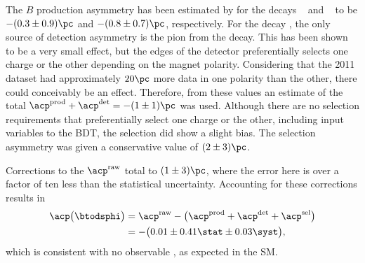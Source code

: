 The $B$ production asymmetry has been estimated by \lhcb for the decays
\decay{\Bp}{\jpsi\pip}~\cite{LHCb-PAPER-2011-024} and
\decay{\Bp}{\Dz\Kp}~\cite{LHCb-PAPER-2012-001} to be
$-(0.3\pm0.9)\pc$ and $-(0.8\pm0.7)\pc$, respectively.
For the decay \btodsphi, the only source of detection asymmetry is the pion from the \Ds decay.
This has been shown to be a very small effect, but the edges of the detector preferentially selects
one charge or the other depending on the magnet polarity.
Considering that the 2011 dataset had approximately $20\pc$ more data in one polarity than the
other, there could conceivably be an effect.
Therefore, from these values an estimate of the total $\acp^\mathrm{prod} + \acp^\mathrm{det}=-(1\pm1)\pc$
was used.
Although there are no selection requirements that preferentially select one charge or the other,
including input variables to the BDT, the selection did show a slight bias.
The selection asymmetry was given a conservative value of $(2\pm3)\pc$.

Corrections to the $\acp^\mathrm{raw}$ total to $(1\pm3)\pc$, where the error here is over a factor
of ten less than the statistical uncertainty.
Accounting for these corrections results in
\begin{align}
  \acp\big(\btodsphi\big)&=
  \acp^\mathrm{raw} - \big(\acp^\mathrm{prod} + \acp^\mathrm{det} +
  \acp^\mathrm{sel}\big)\nonumber\\
  &=
  -\big(0.01\pm0.41\stat\pm0.03\syst\big),
\end{align}
which is consistent with no observable \CPV, as expected in the SM.



